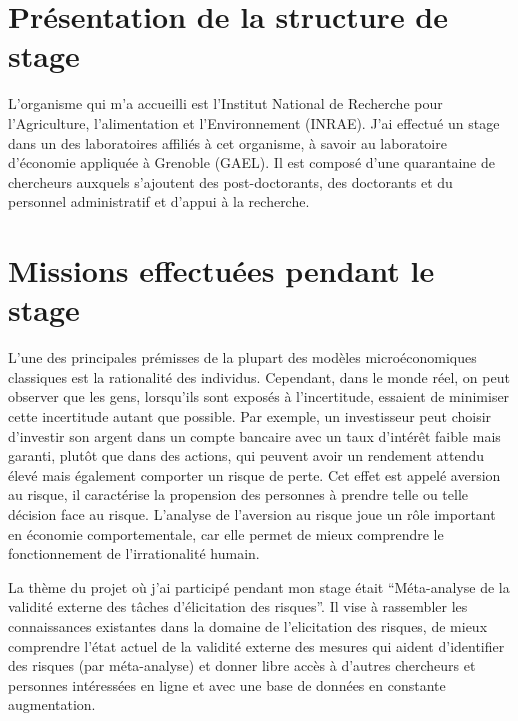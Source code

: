 \documentclass[12pt]{article}
\begin{document}
\section{Présentation de la structure de stage}
\label{sec:second}

L'organisme qui m'a accueilli est l'Institut National de Recherche pour
l'Agriculture, l'alimentation et l'Environnement (INRAE). J'ai effectué
un stage dans un des laboratoires affiliés à cet organisme, à savoir au
laboratoire d'économie appliquée à Grenoble (GAEL). Il est composé d'une
quarantaine de chercheurs auxquels s'ajoutent des post-doctorants, des
doctorants et du personnel administratif et d'appui à la recherche.

\section{Missions effectuées pendant le stage}
\label{sec:third}

L'une des principales prémisses de la plupart des modèles
microéconomiques classiques est la rationalité des individus. Cependant,
dans le monde réel, on peut observer que les gens, lorsqu'ils sont
exposés à l'incertitude, essaient de minimiser cette incertitude autant
que possible. Par exemple, un investisseur peut choisir d'investir son
argent dans un compte bancaire avec un taux d'intérêt faible mais
garanti, plutôt que dans des actions, qui peuvent avoir un rendement
attendu élevé mais également comporter un risque de perte. Cet effet est
appelé aversion au risque, il caractérise la propension des personnes à
prendre telle ou telle décision face au risque. L'analyse de l'aversion
au risque joue un rôle important en économie comportementale, car elle
permet de mieux comprendre le fonctionnement de l'irrationalité humain.

La thème du projet où j'ai participé pendant mon stage était
``Méta-analyse de la validité externe des tâches d'élicitation des
risques''. Il vise à rassembler les connaissances existantes dans la
domaine de l'elicitation des risques, de mieux comprendre l'état actuel
de la validité externe des mesures qui aident d'identifier des risques
(par méta-analyse) et donner libre accès à d'autres chercheurs et
personnes intéressées en ligne et avec une base de données en constante
augmentation.
\end{document}

